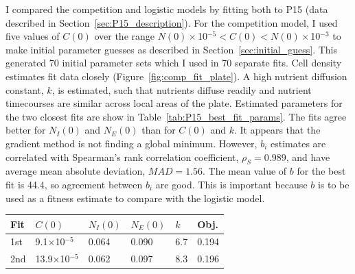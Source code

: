 I compared the competition and logistic models by fitting both to P15
(data described in Section~\ref{sec:P15_description}). For the
competition model, I used five values of \(C(0)\) over the range
\(N(0)\times\)10\(^{-5} < C(0) < N(0)\times\)10\(^{-3}\) to make
initial parameter guesses as described in
Section~\ref{sec:initial_guess}. This generated 70 initial parameter
sets which I used in 70 separate fits. Cell density estimates fit data
closely (Figure~\ref{fig:comp_fit_plate}).
A high nutrient diffusion constant, \(k\), is estimated, such that
nutrients diffuse readily and nutrient timecourses are similar across
local areas of the plate. Estimated parameters for the two closest
fits are show in Table~\ref{tab:P15_best_fit_params}. The fits agree
better for \(N_{I}(0)\) and \(N_{E}(0)\) than for \(C(0)\) and
\(k\). It appears that the gradient method is not finding a global
minimum. However, \(b_{i}\) estimates are correlated with Spearman's
rank correlation coefficient, \(\rho_{S} = 0.989\), and have average
mean absolute deviation, \(MAD = 1.56\). The mean value of \(b\) for
the best fit is 44.4, so agreement between \(b_{i}\) are good. This is
important because \(b\) is to be used as a fitness estimate to compare
with the logistic model.
\begin{center}
  \begin{tabular}{l l l l l l}
    \hline
    Fit     & \(C(0)\)                    & \(N_{I}(0)\) & \(N_{E}(0)\) & \(k\) & Obj.\\
    \hline
    1st     & 9.1\(\times\)10\(^{-5}\)    & 0.064      & 0.090       & 6.7  & 0.194 \\
    2nd     & 13.9\(\times\)10\(^{-5}\)   & 0.062      & 0.097       & 8.3  & 0.196 \\
    \hline
  \end{tabular}
  \label{tab:P15_best_fit_params}
\end{center}

